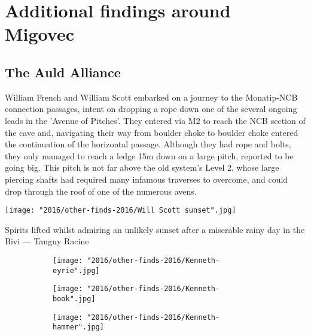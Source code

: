 \section{Additional findings around Migovec}

\subsection{The Auld Alliance}
William French and William Scott embarked on a journey to the Monatip-NCB connection passages, intent on dropping a rope down one of the several ongoing leads in the 'Avenue of Pitches'. They entered via M2 to reach the NCB section of the cave and, navigating their way from boulder choke to boulder choke entered the continuation of the horizontal passage. Although they had rope and bolts, they only managed to reach a ledge 15m down on a large pitch, reported to be going big. This pitch is not far above the old system's Level 2, whose large piercing shafts had required many infamous traverses to overcome, and could drop through the roof of one of the numerous avens.

\begin{marginfigure}
\checkoddpage \ifoddpage \forcerectofloat \else \forceversofloat \fi
\centering
 \texttt{[image: "2016/other-finds-2016/Will Scott sunset".jpg]} 
 \caption{Spirits lifted whilst admiring an unlikely sunset after a miserable rainy day in the Bivi --- Tanguy Racine}
 \label{Sunset}
\end{marginfigure}


\begin{figure*}[t!]
\checkoddpage \ifoddpage \forcerectofloat \else \forceversofloat \fi
\centering

    \begin{subfigure}[t]{0.583\textwidth}
        \centering
        \texttt{[image: "2016/other-finds-2016/Kenneth-eyrie".jpg]} 
        \caption{} \label{moon door}
    \end{subfigure}
        \hfill
\begin{subfigure}[t]{0.407\textwidth}
\centering
\texttt{[image: "2016/other-finds-2016/Kenneth-book".jpg]}
 \caption{}\label{reading in the bivi}
\end{subfigure}
    \vspace{0cm}
    \begin{subfigure}[t]{\textwidth}
    \centering
        \texttt{[image: "2016/other-finds-2016/Kenneth-hammer".jpg]} 
        \caption{} \label{hammer in B9}
    \end{subfigure}
\end{figure*}

